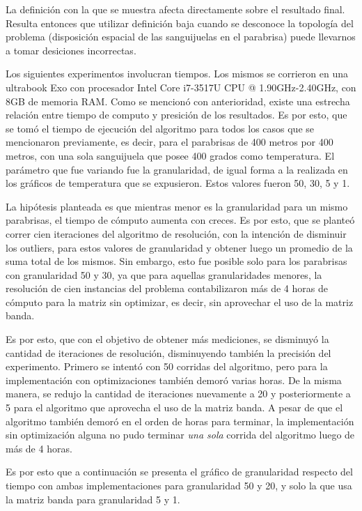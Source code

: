 	La definición con la que se muestra afecta directamente sobre el resultado final. Resulta entonces que utilizar definición baja cuando se desconoce la topología del problema (disposición espacial de las sanguijuelas en el parabrisa) puede llevarnos a tomar desiciones incorrectas.

\newpage
	

\par 
	Los siguientes experimentos involucran tiempos. Los mismos se corrieron en una ultrabook Exo con procesador Intel Core i7-3517U CPU @ 1.90GHz-2.40GHz, con 8GB de memoria RAM.  
	Como se mencionó con anterioridad, existe una estrecha relación entre tiempo de computo y presición de los resultados. Es por esto, que se tomó el tiempo de ejecución del algoritmo para todos los casos que se mencionaron previamente, es decir, para el parabrisas de 400 metros por 400 metros, con una sola sanguijuela que posee 400 grados como temperatura. El parámetro que fue variando fue la granularidad, de igual forma a la realizada en los gráficos de temperatura que se expusieron. Estos valores fueron 50, 30, 5 y 1. 
	\par 
	La hipótesis planteada es que mientras menor es la granularidad para un mismo parabrisas, el tiempo de cómputo aumenta con creces. Es por esto, que se planteó correr cien iteraciones del algoritmo de resolución, con la intención de disminuir los outliers, para estos valores de granularidad  y obtener luego un promedio de la suma total de los mismos. Sin embargo, esto fue posible solo para los parabrisas con granularidad 50 y 30, ya que para aquellas granularidades menores, la resolución de cien instancias del problema contabilizaron más de 4 horas de cómputo para la matriz sin optimizar, es decir, sin aprovechar el uso de la matriz banda.
	\par 
	Es por esto, que con el objetivo de obtener más mediciones, se disminuyó la cantidad de iteraciones de resolución, disminuyendo también la precisión del experimento. Primero se intentó con 50 corridas del algoritmo, pero para la implementación con optimizaciones también demoró varias horas. De la misma manera, se redujo la cantidad de iteraciones nuevamente a 20 y posteriormente a 5 para el algoritmo que aprovecha el uso de la matriz banda. A pesar de que el algoritmo también demoró en el orden de horas para terminar, la implementación sin optimización alguna no pudo terminar \textit{una sola} corrida del algoritmo luego de más de 4 horas. 
	\par 
	Es por esto que a continuación se presenta el gráfico de granularidad respecto del tiempo con ambas implementaciones para granularidad 50 y 20, y solo la que usa la matriz banda para granularidad 5 y 1.
